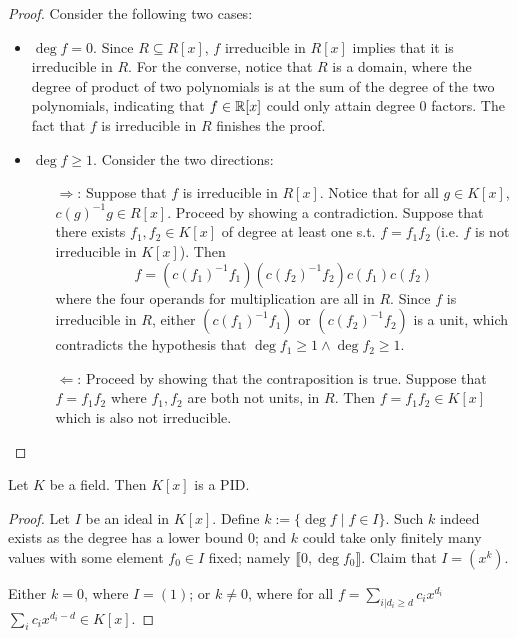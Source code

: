 \begin{proof}
    Consider the following two cases:
    \begin{itemize}
        \item $\deg f = 0$. Since $R\subseteq R[x]$, $f$ irreducible in $R[x]$ implies that it is irreducible in $R$. For the converse, notice that $R$ is a domain, where the degree of product of two polynomials is at the sum of the degree of the two polynomials, indicating that $f\in\mathbb{R}[x]$ could only attain degree 0 factors. The fact that $f$ is irreducible in $R$ finishes the proof.
        \item $\deg f \geq 1$. Consider the two directions:
            \begin{itemize}
                \item[$\Rightarrow$:] Suppose that $f$ is irreducible in $R[x]$. Notice that for all $g\in K[x]$, $c(g)^{-1} g\in R[x]$. Proceed by showing a contradiction. Suppose that there exists $f_1, f_2\in K[x]$ of degree at least one s.t. $f = f_1 f_2$ (i.e. $f$ is not irreducible in $K[x]$). Then
                $$
                    f = (c(f_1)^{-1} f_1) (c(f_2)^{-1} f_2) c(f_1) c(f_2)
                $$
                where the four operands for multiplication are all in $R$. Since $f$ is irreducible in $R$, either $(c(f_1)^{-1} f_1)$ or $(c(f_2)^{-1} f_2)$ is a unit, which contradicts the hypothesis that $\deg f_1 \geq 1 \wedge \deg f_2 \geq 1$.
                \item[$\Leftarrow$:] Proceed by showing that the contraposition is true. Suppose that $f = f_1 f_2$ where $f_1, f_2$ are both not units, in $R$. Then $f = f_1 f_2 \in K[x]$ which is also not irreducible.
            \end{itemize}
    \end{itemize}
\end{proof}

\begin{lemma}\label{lem:K[x] PID}
    Let $K$ be a field. Then $K[x]$ is a PID.
\end{lemma}

\begin{proof}
    Let $I$ be an ideal in $K[x]$. Define $k := \{ \deg f \mid f\in I \}$. Such $k$ indeed exists as the degree has a lower bound $0$; and $k$ could take only finitely many values with some element $f_0\in I$ fixed; namely $\llbracket 0, \deg f_0 \rrbracket$. Claim that $I = (x^k)$.

    Either $k = 0$, where $I = (1)$; or $k \neq 0$, where for all $f = \sum\limits_{i|d_i\geq d} c_i x^{d_i}$ $\sum\limits_{i} c_i x^{d_i - d} \in K[x]$. 
\end{proof}

